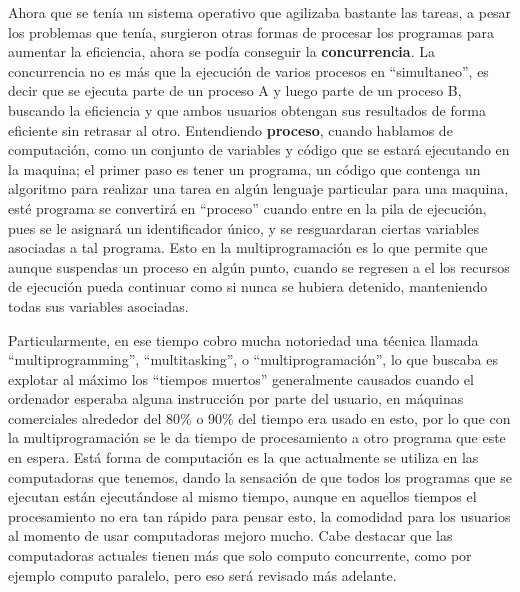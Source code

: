 \documentclass[letterpaper,12pt,oneside]{book}
\begin{document}
		Ahora que se tenía un sistema operativo que agilizaba bastante las tareas, a pesar los problemas que tenía, surgieron otras formas de procesar
		los programas para aumentar la eficiencia, ahora se podía conseguir la \textbf{concurrencia}. La concurrencia no es más que la ejecución de varios
		procesos en ``simultaneo'', es decir que se ejecuta parte de un proceso A y luego parte de un proceso B, buscando la eficiencia y que ambos usuarios obtengan
		sus resultados de forma eficiente sin retrasar al otro. Entendiendo \textbf{proceso}, cuando hablamos de computación, como un conjunto de variables y código que
		se estará ejecutando en la maquina; el primer paso es tener un programa, un código que contenga un algoritmo para realizar una tarea en algún lenguaje
		particular para una maquina, esté programa se convertirá en ``proceso'' cuando entre en la pila de ejecución, pues se le asignará un identificador único,
		y se resguardaran ciertas variables asociadas a tal programa. Esto en la multiprogramación es lo que permite que aunque suspendas un proceso en algún punto,
		cuando se regresen a el los recursos de ejecución pueda continuar como si nunca se hubiera detenido, manteniendo todas sus variables asociadas.
		
		
		Particularmente, en ese tiempo cobro mucha notoriedad una técnica llamada ``multiprogramming'', ``multitasking'',
		o ``multiprogramación'', lo que buscaba es explotar al máximo los ``tiempos muertos'' generalmente causados cuando el ordenador esperaba alguna instrucción por
		parte del usuario, en máquinas comerciales alrededor del 80\% o 90\% del tiempo era usado en esto, por lo que con  la multiprogramación se le da tiempo
		de procesamiento a otro programa que este en espera. Está forma de computación es la que actualmente se utiliza en las computadoras que tenemos, dando
		la sensación de que todos los programas que se ejecutan están ejecutándose al mismo tiempo, aunque en aquellos tiempos el procesamiento no era
		tan rápido para pensar esto, la comodidad para los usuarios al momento de usar computadoras mejoro mucho. Cabe destacar que las computadoras actuales tienen
		más que solo computo concurrente, como por ejemplo computo paralelo, pero eso será revisado más adelante.
		
		
\end{document}
